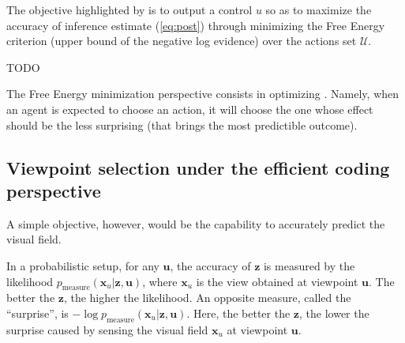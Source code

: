 \documentclass{article}
\begin{document}
The objective highlighted by \cite{friston2012perceptions} is to output a control $u$ so as to maximize the accuracy of inference estimate (\ref{eq:post}) through minimizing the Free Energy criterion (upper bound of the negative log evidence) over the actions set $\mathcal{U}$. 


TODO

The Free Energy minimization perspective consists in optimizing . Namely, when  an agent is expected to choose an action, it will choose the one whose effect should be the less surprising (that brings the most predictible outcome). 










\subsection{Viewpoint selection under the efficient coding perspective}

A simple objective, however, would be the capability to accurately predict the {\color{blue} visual field}. 

In a probabilistic setup, for any $\boldsymbol{u}$, the accuracy of $\boldsymbol{z}$ is measured by the likelihood $p_\text{measure}(\boldsymbol{x}_u|\boldsymbol{z}, \boldsymbol{u})$, where $\boldsymbol{x}_u$ is the view obtained at {\color{blue} viewpoint} $\boldsymbol{u}$. The better the $\boldsymbol{z}$, the higher the likelihood.
An opposite measure, called the ``surprise'', is $-\log p_\text{measure}(\boldsymbol{x}_u|\boldsymbol{z}, \boldsymbol{u})$. 
Here, the better the $\boldsymbol{z}$, the lower the surprise caused by sensing the {\color{blue} visual field} $\boldsymbol{x}_u$ at {\color{blue} viewpoint} $\boldsymbol{u}$.
\end{document}
